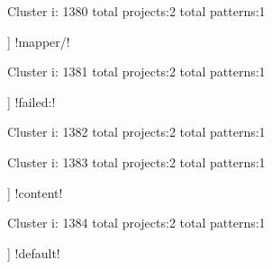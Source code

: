 Cluster i: 1380
total projects:2
total patterns:1
\begin{multicols}{1}
\begin{description}[noitemsep,topsep=0pt]
\item [[2] ] \cverb!mapper/!
\end{description}
\end{multicols}







Cluster i: 1381
total projects:2
total patterns:1
\begin{multicols}{1}
\begin{description}[noitemsep,topsep=0pt]
\item [[2] ] \cverb!failed:!
\end{description}
\end{multicols}







Cluster i: 1382
total projects:2
total patterns:1
\begin{multicols}{1}
\end{multicols}







Cluster i: 1383
total projects:2
total patterns:1
\begin{multicols}{1}
\begin{description}[noitemsep,topsep=0pt]
\item [[2] ] \cverb!content!
\end{description}
\end{multicols}







Cluster i: 1384
total projects:2
total patterns:1
\begin{multicols}{1}
\begin{description}[noitemsep,topsep=0pt]
\item [[2] ] \cverb!default!
\end{description}
\end{multicols}







